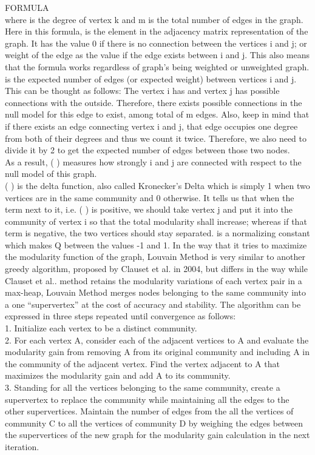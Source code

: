 \documentclass[10pt]{article}
\begin{document}
FORMULA \\

where is the degree of vertex k and m is the total number of edges in the graph. Here in this formula, is the element in the adjacency matrix representation of the graph. It has the value 0 if there is no connection between the vertices i and j; or weight of the edge as the value if the edge exists between i and j. This also means that the formula works regardless of graph’s being weighted or unweighted graph. \\
is the expected number of edges (or expected weight) between vertices i and j. This can be thought as follows: The vertex i has and vertex j has possible connections with the outside. Therefore, there exists possible connections in the null model for this edge to exist, among total of m edges. Also, keep in mind that if there exists an edge connecting vertex i and j, that edge occupies one degree from both of their degrees and thus we count it twice. Therefore, we also need to divide it by 2 to get the expected number of edges between those two nodes. \\

As a result, ( ) measures how strongly i and j are connected with respect to the null model of this graph. \\

( ) is the delta function, also called Kronecker’s Delta which is simply 1 when two vertices are
in the same community and 0 otherwise. It tells us that when the term next to it, i.e. ( ) is
positive, we should take vertex j and put it into the community of vertex i so that the total modularity shall increase; whereas if that term is negative, the two vertices should stay separated.
is a normalizing constant which makes Q between the values -1 and 1.
In the way that it tries to maximize the modularity function of the graph, Louvain Method is very similar to another greedy algorithm, proposed by Clauset et al. in 2004, but differs in the way while Clauset et al.\cite{clauset}. method retains the modularity variations of each vertex pair in a max-heap, Louvain Method merges nodes belonging to the same community into a one “supervertex” at the cost of accuracy and stability\cite{blondel}.
The algorithm can be expressed in three steps repeated until convergence as follows: \\

1. Initialize each vertex to be a distinct community. \\
2. For each vertex A, consider each of the adjacent vertices to A and evaluate the modularity gain from removing A from its original community and including A in the community of the adjacent vertex. Find the vertex adjacent to A that maximizes the modularity gain and add A to its community. \\
3. Standing for all the vertices belonging to the same community, create a supervertex to replace the community while maintaining all the edges to the other supervertices. Maintain the number of edges from the all the vertices of community C to all the vertices of community D by weighing the edges between the supervertices of the new graph for the modularity gain calculation in the next iteration. \\
\end{document}
